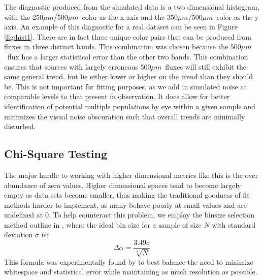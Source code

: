 \documentclass[twocolumn,letterpaper,10pt]{article}
\def \um {$\mu m$}
\begin{document}
The diagnostic produced from the simulated data is a two dimensional histogram, with the 250\um/500\um\ color as the x axis and the 350\um/500\um\ color as the y axis. An example of this diagnostic for a real dataset can be seen in Figure \ref{fig:hist1}. There are in fact three unique color pairs that can be produced from fluxes in three distinct bands. This combination was chosen because the 500\um\ flux has a larger statistical error than the other two bands. This combination ensures that sources with largely erroneous 500\um\ fluxes will still exhibit the same general trend, but lie either lower or higher on the trend than they should be. This is not important for fitting purposes, as we add in simulated noise at comparable levels to that present in observation. It does allow for better identification of potential multiple populations by eye within a given sample and minimizes the visual noise obscuration such that overall trends are minimally disturbed.

\subsection{Chi-Square Testing}\label{chisq}

The major hurdle to working with higher dimensional metrics like this is the over abundance of zero values. Higher dimensional spaces tend to become largely empty as data sets become smaller, thus making the traditional goodness of fit methods harder to implement, as many behave poorly at small values and are undefined at 0. To help counteract this problem, we employ the binsize selection method outline in \citet{binsize}, where the ideal bin size for a sample of size $N$ with standard deviation $\sigma$ is: 
$$
\Delta \alpha=\frac{3.49\sigma}{\sqrt[3]{N}}$$
 This formula was experimentally found by \citet{binsize} to best balance the need to minimize whitespace and statistical error while maintaining as much resolution as possible.
\end{document}
